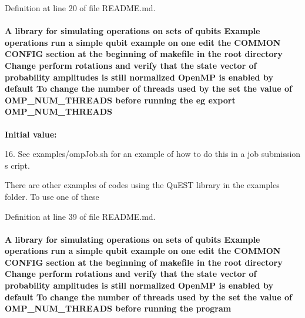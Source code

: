 Definition at line 20 of file README.md.\hypertarget{README_8md_a79266f70cc0ecc5861ae53ebd180bf65}{
\paragraph[{OMP\_\-NUM\_\-THREADS}]{\setlength{\rightskip}{0pt plus 5cm}A library for simulating operations on sets of qubits Example operations run a simple qubit example on one edit the COMMON CONFIG section at the beginning of makefile in the root directory Change perform {\bf rotations} and verify that the state vector of probability amplitudes {\bf is} still normalized OpenMP {\bf is} enabled by default To change the number of threads used by the set the value of {\bf OMP\_\-NUM\_\-THREADS} before running the {\bf eg} export {\bf OMP\_\-NUM\_\-THREADS}}\hfill}
\label{README_8md_a79266f70cc0ecc5861ae53ebd180bf65}
{\bfseries Initial value:}
\begin{DoxyCode}
16. See examples/ompJob.sh for an example of how to do this in a job submission s
      cript.



There are other examples of codes using the QuEST library in the examples folder.
       To use one of these
\end{DoxyCode}


Definition at line 39 of file README.md.\hypertarget{README_8md_ad51f198e6518042d9d4721d7ffe92d71}{
\paragraph[{program}]{\setlength{\rightskip}{0pt plus 5cm}A library for simulating operations on sets of qubits Example operations run a simple qubit example on one edit the COMMON CONFIG section at the beginning of makefile in the root directory Change perform {\bf rotations} and verify that the state vector of probability amplitudes {\bf is} still normalized OpenMP {\bf is} enabled by default To change the number of threads used by the set the value of {\bf OMP\_\-NUM\_\-THREADS} before running the {\bf program}}\hfill}
\label{README_8md_ad51f198e6518042d9d4721d7ffe92d71}


